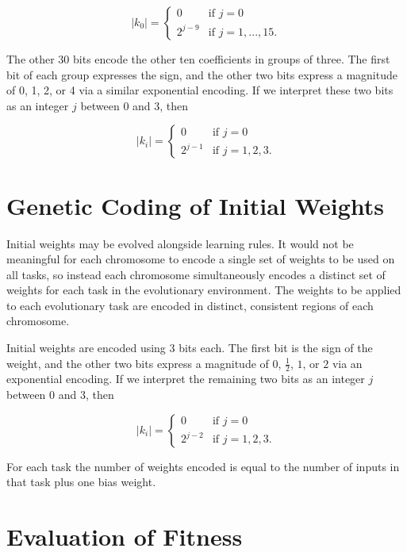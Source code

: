 \documentclass[master]{outhesis}
\begin{document}
\[
	|k_0|=
	\begin{cases}
		0 & \text{if $j = 0$}\\
		2^{j-9} & \text{if $j = 1, ..., 15$.}
	\end{cases}
\]

The other 30 bits encode the other ten coefficients in groups of three. The first bit of each group expresses the sign, and the other two bits express a magnitude of 0, 1, 2, or 4 via a similar exponential encoding. If we interpret these two bits as an integer $j$ between 0 and 3, then

\[
	|k_i|=
	\begin{cases}
		0 & \text{if $j = 0$}\\
		2^{j-1} & \text{if $j = 1, 2, 3$.}
	\end{cases}
\]

\section{Genetic Coding of Initial Weights}

Initial weights may be evolved alongside learning rules. It would not be meaningful for each chromosome to encode a single set of weights to be used on all tasks, so instead each chromosome simultaneously encodes a distinct set of weights for each task in the evolutionary environment. The weights to be applied to each evolutionary task are encoded in distinct, consistent regions of each chromosome. 

\newcommand{\bitsperweight}{3}
\newcommand{\jlen}{2}
\newcommand{\jmin}{0}
\newcommand{\jmax}{3}
\newcommand{\exponentshift}{4}

Initial weights are encoded using 3 bits each. The first bit is the sign of the weight, and the other two bits express a magnitude of 0, $\frac{1}{2}$, $1$, or $2$ via an exponential encoding. If we interpret the remaining two bits as an integer $j$ between 0 and 3, then

\[
	|k_i|=
	\begin{cases}
		0 & \text{if $j = 0$}\\
		2^{j-2} & \text{if $j = 1, 2, 3$.}
	\end{cases}
\]

For each task the number of weights encoded is equal to the number of inputs in that task plus one bias weight.

\section{Evaluation of Fitness}
\end{document}
